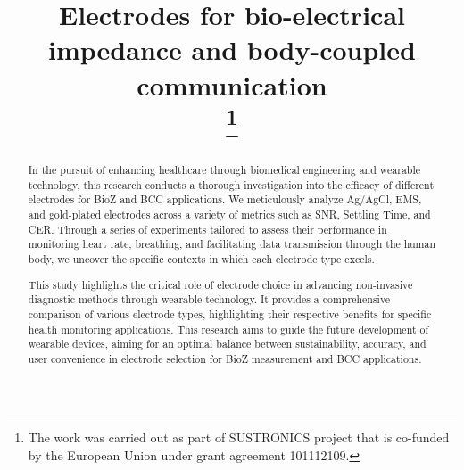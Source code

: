 \documentclass[conference]{IEEEtran}
\begin{document}

\title{Electrodes for bio-electrical impedance and body-coupled communication\\

\thanks{The work was carried out as part of SUSTRONICS
project that is co-funded by the European Union under grant
agreement 101112109.}
}

\author{
\and
{}
\and
{}
\and

\and
{}
\and
{}
}

\maketitle

\begin{abstract}
    In the pursuit of enhancing healthcare through biomedical engineering and wearable technology, this research conducts a thorough investigation into the efficacy of different electrodes for \gls{BioZ} and \gls{BCC} applications. We meticulously analyze Ag/AgCl, \gls{EMS}, and gold-plated electrodes across a variety of metrics such as \gls{SNR}, Settling Time, and \gls{CER}. Through a series of experiments tailored to assess their performance in monitoring heart rate, breathing, and facilitating data transmission through the human body, we uncover the specific contexts in which each electrode type excels.

    This study highlights the critical role of electrode choice in advancing non-invasive diagnostic methods  through wearable technology. It provides a comprehensive comparison of various electrode types, highlighting their respective benefits for specific health monitoring applications. This research aims to guide the future development of wearable devices, aiming for an optimal balance between sustainability, accuracy, and user convenience in electrode selection for \gls{BioZ} measurement and \gls{BCC} applications.  
\end{abstract}
\end{document}
